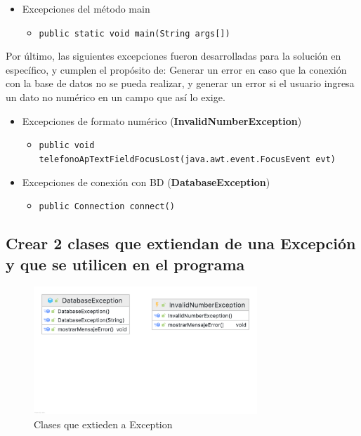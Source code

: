 \begin{itemize}
    \item Excepciones del método main
    \begin{itemize}
        \item \texttt{public static void main(String args[])}
    \end{itemize}
\end{itemize}

Por último, las siguientes excepciones fueron desarrolladas para la solución en específico, y cumplen el propósito de: Generar un error en caso que la conexión con la base de datos no se pueda realizar, y generar un error si el usuario ingresa un dato no numérico en un campo que así lo exige.

\begin{itemize}
    \item Excepciones de formato numérico (\textbf{InvalidNumberException})
    \begin{itemize}
        \item \texttt{public void telefonoApTextFieldFocusLost(java.awt.event.FocusEvent evt)}
    \end{itemize}
    \item Excepciones de conexión con BD (\textbf{DatabaseException})
    \begin{itemize}
        \item \texttt{public Connection connect()}
    \end{itemize}
\end{itemize}

\subsection{Crear 2 clases que extiendan de una Excepción y que se utilicen en el programa}

\begin{figure}[h]
    \centering
    \includegraphics[width=0.75\textwidth]{contents/img/img15}
    \caption{Clases que extieden a Exception}
    \label{fig:img15}
\end{figure}

